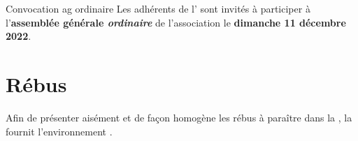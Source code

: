 \documentclass{letgut}
\begin{document}
\begin{ltx-code-result}[title addon=annonces]
\begin{announcement}{Convocation \acs{ag} ordinaire}
  Les adhérents de l'\assogut{} sont invités à participer à
  l'\textbf{assemblée générale \emph{ordinaire}} de l'association
  le \textbf{dimanche 11 décembre 2022}.
\end{announcement}
\end{ltx-code-result}

\section{Rébus}
\label{sec:rebus}

\tcbstartrecording\relax
Afin de présenter aisément et de façon homogène les rébus à paraître dans la
, la  fournit l'environnement .
\end{document}
